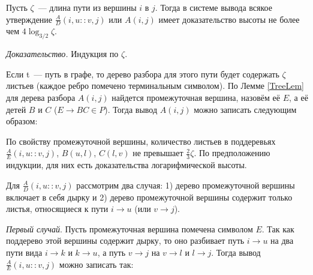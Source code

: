 \begin{lemmarus}\label{Depthlem}
Пусть $\zeta$~--- длина пути из вершины $i$ в $j$. Тогда в системе вывода всякое утверждение $\frac{A}{D}(i , u :: v , j)$ или $A(i , j)$ имеет доказательство высоты не более чем $4\log_{3/2}\zeta$.
\end{lemmarus}
\textit{Доказательство.} Индукция по $\zeta$.

Если t~--- путь в графе, то дерево разбора для этого пути будет содержать $\zeta$ листьев (каждое ребро помечено терминальным символом). По Лемме \ref{TreeLem} для дерева разбора $A(i, j)$ найдется промежуточная вершина, назовём её $E$, а её детей $B$ и $C$ ($E \rightarrow BC \in P$). Тогда вывод $A(i , j)$ можно записать следующим образом:
\begin{prooftree}
\end{prooftree}

По свойству промежуточной вершины, количество листьев в поддеревьях $\frac{A}{E}(i , u :: v , j)$, $B(u, l)$, $C(l, v)$ не превышает $\frac{2}{3}\zeta$. По предположению индукции, для них есть доказательства логарифмической высоты.

Для $\frac{A}{D}(i , u :: v , j)$ рассмотрим два случая: 1) дерево промежуточной вершины включает в себя дырку и 2) дерево промежуточной вершины содержит только листья, относящиеся к пути $i \rightarrow u$ (или $v \rightarrow j$).

\textit{Первый случай}. Пусть промежуточная вершина помечена символом $E$. Так как поддерево этой вершины содержит дырку, то оно разбивает путь $i \rightarrow u$ на два пути вида $i \rightarrow k$ и $k \rightarrow u$, а путь $v \rightarrow j$ на $v \rightarrow l$ и $l \rightarrow j$.
Тогда вывод $\frac{A}{E}(i , u :: v , j)$ можно записать так:
\begin{prooftree}
\end{prooftree}

